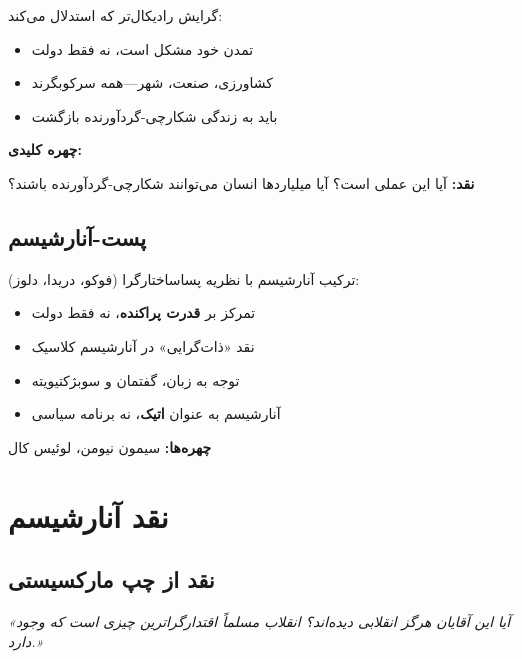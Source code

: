 \begin{defbox}
گرایش رادیکال‌تر که استدلال می‌کند:
\begin{itemize}[nosep]
    \item تمدن خود مشکل است، نه فقط دولت
    \item کشاورزی، صنعت، شهر—همه سرکوبگرند
    \item باید به زندگی شکارچی-گردآورنده بازگشت
\end{itemize}
\textbf{چهره کلیدی:} 

\textbf{نقد:} آیا این عملی است؟ آیا میلیاردها انسان می‌توانند شکارچی-گردآورنده باشند؟
\end{defbox}

\subsection{پست-آنارشیسم}

\begin{defbox}
ترکیب آنارشیسم با نظریه پساساختارگرا (فوکو، دریدا، دلوز):
\begin{itemize}[nosep]
    \item تمرکز بر \textbf{قدرت پراکنده}، نه فقط دولت
    \item نقد «ذات‌گرایی» در آنارشیسم کلاسیک
    \item توجه به زبان، گفتمان و سوبژکتیویته
    \item آنارشیسم به عنوان \textbf{اتیک}، نه برنامه سیاسی
\end{itemize}
\textbf{چهره‌ها:} سیمون نیومن، لوئیس کال
\end{defbox}

\section{نقد آنارشیسم}

\subsection{نقد از چپ مارکسیستی}

\begin{quotebox}
\textit{«آیا این آقایان هرگز انقلابی دیده‌اند؟ انقلاب مسلماً اقتدارگراترین چیزی است که وجود دارد.»}
\end{quotebox}

